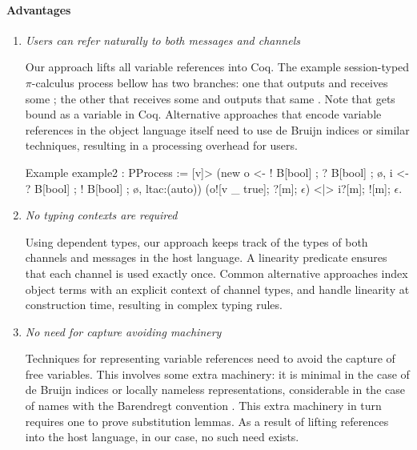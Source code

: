 \documentclass{mproj}
\newcommand{\picalc}{$\pi$-calculus}
\begin{document}
\paragraph{Advantages}
\begin{enumerate}
    \item \emph{Users can refer naturally to both messages and channels}

        Our approach lifts all variable references into Coq. The example session-typed \picalc{} process bellow has two branches: one that outputs  and receives some ; the other that receives some  and outputs that same . Note that  gets bound as a variable in Coq. Alternative approaches that encode variable references in the object language itself need to use de Bruijn indices \cite{deBruijn1972} or similar techniques, resulting in a processing overhead for users.
        
    \begin{coq}
    Example example2 : PProcess := [v]>
        (new o <- ! B[bool] ; ? B[bool] ; ø,
             i <- ? B[bool] ; ! B[bool] ; ø,
             ltac:(auto))
        (o![v _ true]; ?[m]; $\epsilon$) <|> i?[m]; ![m]; $\epsilon$.
    \end{coq}

    \item \emph{No typing contexts are required}

        Using dependent types, our approach keeps track of the types of both channels and messages in the host language. A linearity predicate ensures that each channel is used exactly once. Common alternative approaches index object terms with an explicit context of channel types, and handle linearity at construction time, resulting in complex typing rules.

    \item \emph{No need for capture avoiding machinery}

        Techniques for representing variable references need to avoid the capture of free variables. This involves some extra machinery: it is minimal in the case of de Bruijn indices \cite{deBruijn1972} or locally nameless representations, considerable in the case of names with the Barendregt convention \cite{Barendregt1984}. This extra machinery in turn requires one to prove substitution lemmas. As a result of lifting references into the host language, in our case, no such need exists.
\end{enumerate}
\end{document}

